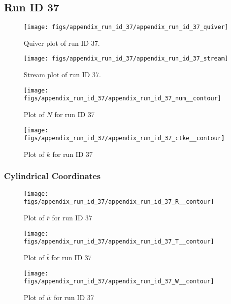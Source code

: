\subsection{Run ID 37}
\begin{figure}[H]
\centering
\texttt{[image: figs/appendix\_run\_id\_37/appendix\_run\_id\_37\_quiver]}
\caption{Quiver plot of run ID 37.}
\label{fig:appendix_run_id_37_quiver}
\end{figure}


\begin{figure}[H]
\centering
\texttt{[image: figs/appendix\_run\_id\_37/appendix\_run\_id\_37\_stream]}
\caption{Stream plot of run ID 37.}
\label{fig:appendix_run_id_37_stream}
\end{figure}


\begin{figure}[H]
\centering
\texttt{[image: figs/appendix\_run\_id\_37/appendix\_run\_id\_37\_num\_\_contour]}
\caption{Plot of $N$ for run ID 37}
\label{fig:appendix_run_id_37_num__contour}
\end{figure}


\begin{figure}[H]
\centering
\texttt{[image: figs/appendix\_run\_id\_37/appendix\_run\_id\_37\_ctke\_\_contour]}
\caption{Plot of $k$ for run ID 37}
\label{fig:appendix_run_id_37_ctke__contour}
\end{figure}


\subsubsection{Cylindrical Coordinates}
\begin{figure}[H]
\centering
\texttt{[image: figs/appendix\_run\_id\_37/appendix\_run\_id\_37\_R\_\_contour]}
\caption{Plot of $\overline{r}$ for run ID 37}
\label{fig:appendix_run_id_37_R__contour}
\end{figure}


\begin{figure}[H]
\centering
\texttt{[image: figs/appendix\_run\_id\_37/appendix\_run\_id\_37\_T\_\_contour]}
\caption{Plot of $\overline{t}$ for run ID 37}
\label{fig:appendix_run_id_37_T__contour}
\end{figure}


\begin{figure}[H]
\centering
\texttt{[image: figs/appendix\_run\_id\_37/appendix\_run\_id\_37\_W\_\_contour]}
\caption{Plot of $\overline{w}$ for run ID 37}
\label{fig:appendix_run_id_37_W__contour}
\end{figure}


